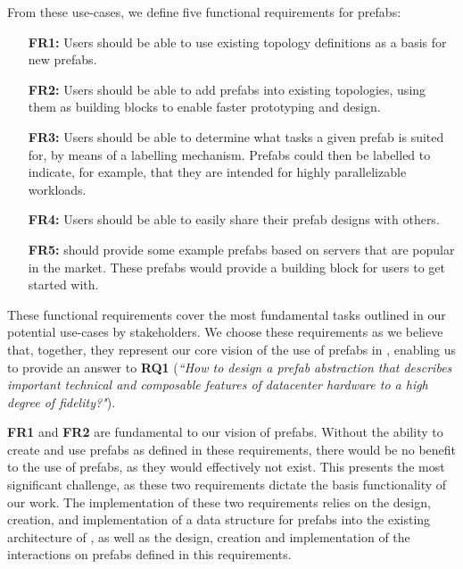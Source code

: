 \documentclass[11pt]{article}
\begin{document}
		From these use-cases, we define five functional requirements for prefabs:
		\begin{itemize}
			\item [\textbf{FR1:}] Users should be able to use existing topology definitions as a basis for new prefabs.
			\item [\textbf{FR2:}] Users should be able to add prefabs into existing topologies, using them as building blocks to enable faster prototyping and design.
			\item [\textbf{FR3:}] Users should be able to determine what tasks a given prefab is suited for, by means of a labelling mechanism. Prefabs could then be labelled to indicate, for example, that they are intended for highly parallelizable workloads.
			\item [\textbf{FR4:}] Users should be able to easily share their prefab designs with others.
			\item [\textbf{FR5:}] \opendc{} should provide some example prefabs based on servers that are popular in the market. These prefabs would provide a building block for users to get started with.
		\end{itemize}

		These functional requirements cover the most fundamental tasks outlined in our potential use-cases by stakeholders.
		We choose these requirements as we believe that, together, they represent our core vision of the use of prefabs in \opendc{}, enabling us to provide an answer to \textbf{RQ1} (\textit{``How to design a prefab abstraction that describes important technical and composable features of datacenter hardware to a high degree of fidelity?"}).

		\textbf{FR1} and \textbf{FR2} are fundamental to our vision of prefabs.
		Without the ability to create and use prefabs as defined in these requirements, there would be no benefit to the use of prefabs, as they would effectively not exist.
		This presents the most significant challenge, as these two requirements dictate the basis functionality of our work.
		The implementation of these two requirements relies on the design, creation, and implementation of a data structure for prefabs into the existing architecture of \opendc{}, as well as the design, creation and implementation of the interactions on prefabs defined in this requirements.
\end{document}
